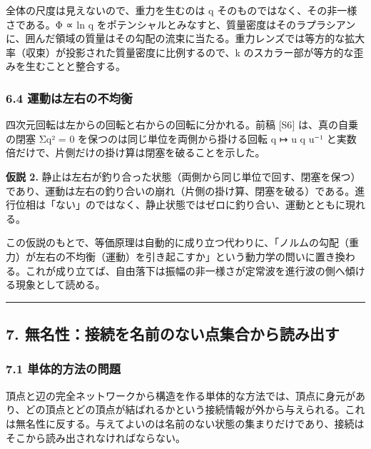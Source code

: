 \documentclass[
  a4paper,
]{ltjsarticle}
\begin{document}
全体の尺度は見えないので、重力を生むのは \textbar q\textbar{}
そのものではなく、その非一様さである。Φ ∝ ln \textbar q\textbar{}
をポテンシャルとみなすと、質量密度はそのラプラシアンに、囲んだ領域の質量はその勾配の流束に当たる。重力レンズでは等方的な拡大率（収束）が投影された質量密度に比例するので、k
のスカラー部が等方的な歪みを生むことと整合する。

\subsubsection{6.4
運動は左右の不均衡}\label{ux904bux52d5ux306fux5de6ux53f3ux306eux4e0dux5747ux8861}

四次元回転は左からの回転と右からの回転に分かれる。前稿 {[}S6{]}
は、真の自乗の閉塞 Σq² = 0 を保つのは同じ単位を両側から掛ける回転 q ↦ u
q u⁻¹ と実数倍だけで、片側だけの掛け算は閉塞を破ることを示した。

\textbf{仮説 2.}
静止は左右が釣り合った状態（両側から同じ単位で回す、閉塞を保つ）であり、運動は左右の釣り合いの崩れ（片側の掛け算、閉塞を破る）である。進行位相は「ない」のではなく、静止状態ではゼロに釣り合い、運動とともに現れる。

この仮説のもとで、等価原理は自動的に成り立つ代わりに、「ノルムの勾配（重力）が左右の不均衡（運動）を引き起こすか」という動力学の問いに置き換わる。これが成り立てば、自由落下は振幅の非一様さが定常波を進行波の側へ傾ける現象として読める。

\begin{center}\rule{0.5\linewidth}{0.5pt}\end{center}

\subsection{7.
無名性：接続を名前のない点集合から読み出す}\label{ux7121ux540dux6027ux63a5ux7d9aux3092ux540dux524dux306eux306aux3044ux70b9ux96c6ux5408ux304bux3089ux8aadux307fux51faux3059}

\subsubsection{7.1
単体的方法の問題}\label{ux5358ux4f53ux7684ux65b9ux6cd5ux306eux554fux984c}

頂点と辺の完全ネットワークから構造を作る単体的な方法では、頂点に身元があり、どの頂点とどの頂点が結ばれるかという接続情報が外から与えられる。これは無名性に反する。与えてよいのは名前のない状態の集まりだけであり、接続はそこから読み出されなければならない。
\end{document}
